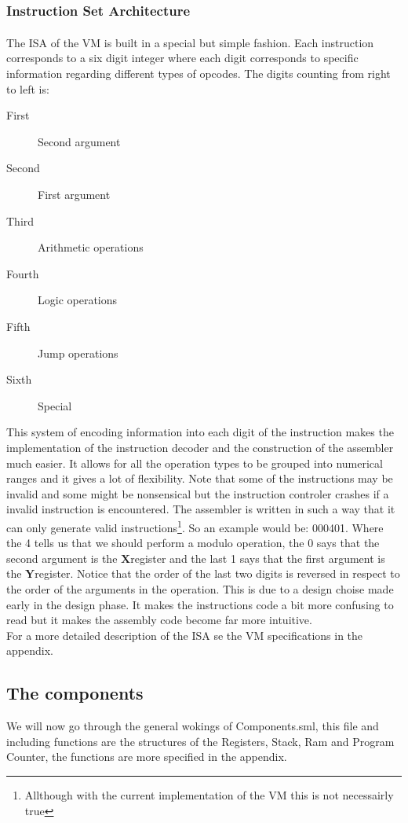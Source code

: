 \documentclass{article}
\newcommand{\x}{$\textbf{X}$}
\newcommand{\y}{$\textbf{Y}$}
\begin{document}
\subsubsection{Instruction Set Architecture}
The ISA\textsuperscript{\cite{ISA}} of the VM is built in a special but simple
fashion. Each instruction corresponds to a six digit integer 
where each digit corresponds to specific information regarding different types
of opcodes. The digits counting from right to left is: 

\begin{description}
  \item[First] Second argument
  \item[Second] First argument
  \item[Third] Arithmetic operations
  \item[Fourth] Logic operations
  \item[Fifth] Jump operations
  \item[Sixth] Special
\end{description}
This system of encoding information into each digit of the instruction makes the
implementation of the instruction decoder and the construction of the assembler
much easier.
It allows for all the operation types to be grouped into numerical ranges and it
gives  a lot of flexibility. Note that some of the instructions may be invalid
and some might be nonsensical but the instruction controler crashes if a invalid
instruction is encountered. The assembler is written in such a way that it can
only generate valid instructions\footnote{Allthough with the current
implementation of  the VM this is not necessairly true}.
So an example would be:
000401.
Where the 4 tells us that we should perform a modulo operation, 
the 0 says that the second argument is the \x register and the last 1 says 
that the first argument is the \y register. Notice that the order of
the last two digits is reversed in respect to the order of the arguments in
the operation.
This is due to a design choise made early in the design phase. It makes the
instructions code a bit more confusing to read but it makes the assembly code
become far more intuitive.\\
For a more detailed description of the ISA se the VM specifications in the
appendix.

\subsection{The components}
We will now go through the general wokings of Components.sml, this file and
including functions are the structures of the Registers, Stack, Ram and Program
Counter, the functions are more specified in the appendix.
\end{document}
